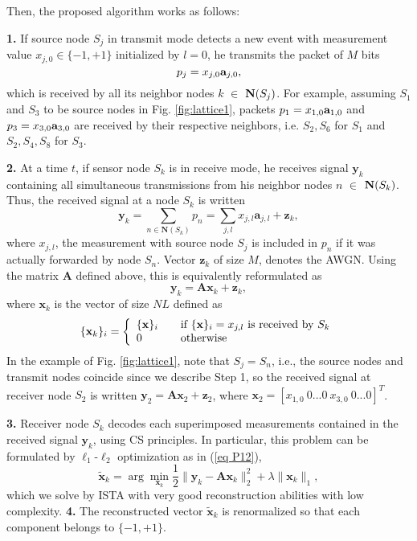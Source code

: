 \documentclass[letterpaper,conference]{IEEEtran}
\begin{document}
Then, the proposed algorithm works as follows:

\noindent \textbf{1.} If source node $S_j$ in transmit mode detects a new event with measurement value $x_{j,0} \in \{-1,+1\}$ initialized by $l=0$, he transmits the packet of $M$ bits
\begin{equation}
    p_{j}=x_{j,0}\mbox{\bf a}_{j,0},
\end{equation}
which is received by all its neighbor nodes $k$ $\in$ $\mbox{\bf N}(S_j)$.
For example, assuming $S_1$ and $S_3$ to be source nodes in Fig. \ref{fig:lattice1}, packets $p_{1}=x_{1,0}\mbox{\bf a}_{1,0}$ and $p_{3}=x_{3,0}\mbox{\bf a}_{3,0}$ are received by their respective neighbors, i.e. $S_2, S_6$ for $S_1$ and $S_2, S_4, S_{8}$ for $S_3$.

\noindent \textbf{2.} At a time $t$, if sensor node $S_k$ is in receive mode, he receives signal $\mathbf{y}_{k}$ containing all simultaneous transmissions from his neighbor nodes $n$ $\in$ $\mbox{\bf N}(S_k)$. Thus, the received signal at a node $S_k$ is written
  \begin{equation}\label{eq 1}
     \mathbf{y}_{k}=\sum_{n \in \mathbf{N}(S_k)}p_{n}=\sum_{j,l}x_{j,l}\mathbf{a}_{j,l}+\mathbf{z}_{k},
  \end{equation}
where $x_{j,l}$, the measurement with source node $S_j$ is included in $p_{n}$ if it was actually forwarded by node $S_n$. Vector $\mathbf{z}_k$ of size $M$, denotes the AWGN.
Using the matrix $\mathbf{A}$ defined above, this is equivalently reformulated as
\begin{equation}
\mathbf{y}_k=\mathbf{A}\mathbf{x}_k+\mathbf{z}_k,
\end{equation}
where $\mathbf{x}_k$ is the vector of size $NL$ defined as
\[
   \{\mathbf{x}_k\}_i = \left\{
  \begin{array}{l l}
     \{\mathbf{x}\}_i & \quad \text{if $\{\mathbf{x}\}_i=x_{j,l}$ is received by $S_k$}\\
     0 & \quad \text{otherwise}\\
   \end{array} \right.
 \]
In the example of Fig. \ref{fig:lattice1}, note that $S_j=S_n$, i.e., the source nodes and transmit nodes coincide since we describe Step 1, so the received signal at receiver node $S_2$ is written $\mathbf{y}_2=\mathbf{A}\mathbf{x}_2+\mathbf{z}_2$, where
$\mathbf{x}_2=[x_{1,0} \ 0...0 \ x_{3,0} \ 0...0]^T$.




\noindent \textbf{3.} Receiver node $S_k$ decodes each superimposed measurements contained in the received signal $\mathbf{y}_{k}$, using CS principles. In particular, this problem can be formulated by $\ell_1$-$\ell_2$ optimization as in (\ref{eq P12}),
     \begin{equation}\label{eq 4}
  \mathbf{\tilde{x}}_k=\arg \min_{\mathbf{x}_k} \frac{1}{2}\|\mathbf{y}_{k}-\mathbf{A}\mathbf{x}_k\|_2^2+\lambda \|\mathbf{x}_k\|_1,
  \end{equation}
which we solve by ISTA with very good reconstruction abilities with low complexity. 
\noindent \textbf{4.} The reconstructed vector $\mathbf{\tilde{x}}_k$ is renormalized so that each component belongs to $\{-1,+1\}$.
\end{document}

